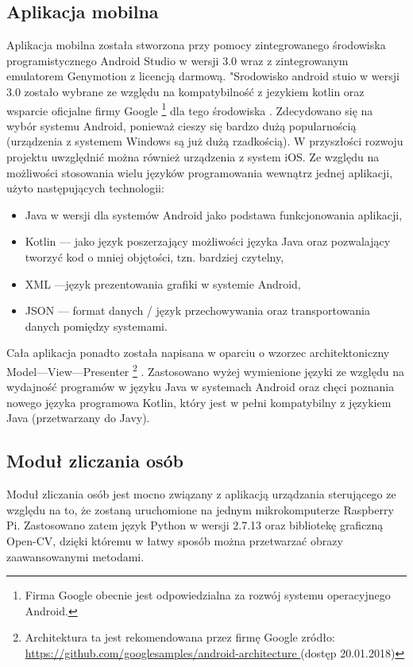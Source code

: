 \subsection{Aplikacja mobilna}
Aplikacja mobilna została stworzona przy pomocy zintegrowanego środowiska programistycznego Android Studio w wersji 3.0 wraz z zintegrowanym emulatorem Genymotion z licencją darmową. "Srodowisko android stuio w wersji 3.0 zostało wybrane ze względu na kompatybilność z jezykiem kotlin oraz wsparcie oficjalne firmy Google
 \footnote{Firma Google obecnie jest odpowiedzialna za rozwój systemu operacyjnego Android.}
 dla tego środowiska . Zdecydowano się na wybór systemu Android, ponieważ cieszy się bardzo dużą popularnością (urządzenia z systemem Windows są już dużą rzadkością). W przyszłości rozwoju projektu uwzględnić można również urządzenia z system iOS. Ze względu na możliwości stosowania wielu języków programowania wewnątrz jednej aplikacji, użyto następujących technologii:
\begin{itemize}
	\item Java w wersji dla systemów Android jako podstawa funkcjonowania aplikacji,
	\item Kotlin --- jako język poszerzający możliwości języka Java oraz pozwalający tworzyć kod o mniej objętości, tzn. bardziej czytelny,
	\item XML ---język prezentowania grafiki w systemie Android,
	\item JSON --- format danych / język przechowywania oraz transportowania danych pomiędzy systemami.
\end{itemize}
Cała aplikacja ponadto została napisana w oparciu o wzorzec architektoniczny Model---View---Presenter
 \footnote{
Architektura ta jest rekomendowana przez firmę Google
zródło: 
\href {	https://github.com/googlesamples/android-architecture } 
{	https://github.com/googlesamples/android-architecture } (dostęp 20.01.2018) 
}
. Zastosowano wyżej wymienione języki ze względu na wydajność programów w języku Java w systemach Android oraz chęci poznania nowego języka programowa Kotlin, który jest w pełni kompatybilny z językiem Java (przetwarzany do Javy).  


\subsection{Moduł zliczania osób}
Moduł zliczania osób jest mocno związany z aplikacją urządzania sterującego ze względu na to, że zostaną uruchomione na jednym mikrokomputerze Raspberry Pi. Zastosowano zatem język Python w wersji 2.7.13 oraz bibliotekę graficzną Open-CV, dzięki któremu w łatwy sposób można przetwarzać obrazy zaawansowanymi metodami. 


